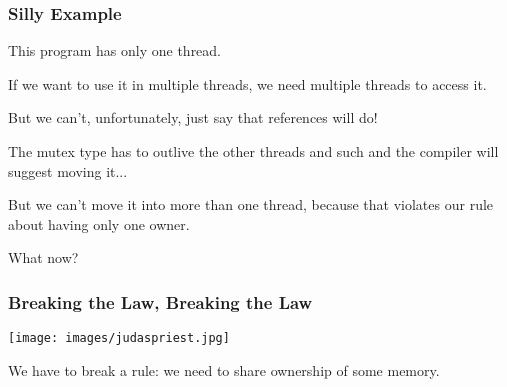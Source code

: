 \begin{frame}
\frametitle{Silly Example}
This program has only one thread.

If we want to use it in multiple threads, we need multiple threads to access it. 

But we can't, unfortunately, just say that references will do! 

The mutex type has to outlive the other threads and such and the compiler will suggest moving it... 

But we can't move it into more than one thread, because that violates our rule about having only one owner. 

What now?



\end{frame}

\begin{frame}
\frametitle{Breaking the Law, Breaking the Law}

\begin{center}
	\texttt{[image: images/judaspriest.jpg]}
\end{center}

We have to break a rule: we need to share ownership of some memory. 

\end{frame}





